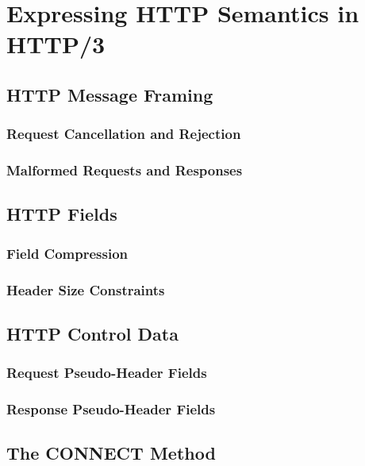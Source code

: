 \documentclass{article}
\begin{document}
\section{Expressing HTTP Semantics in HTTP/3}

\subsection{HTTP Message Framing}

\subsubsection{Request Cancellation and Rejection}

\subsubsection{Malformed Requests and Responses}

\subsection{HTTP Fields}

\subsubsection{Field Compression}

\subsubsection{Header Size Constraints}

\subsection{HTTP Control Data}

\subsubsection{Request Pseudo-Header Fields}

\subsubsection{Response Pseudo-Header Fields}

\subsection{The CONNECT Method}
\end{document}
